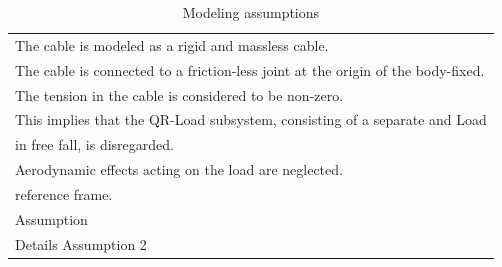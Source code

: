 \begin{table}[h!]
\begin{tabular}{|p{\textwidth}|}
				\tabitem The cable is modeled as a rigid and massless cable. \\
		\tabitem The cable is connected to a friction-less joint at the origin of the body-fixed. \\
		\tabitem The tension in the cable is considered to be non-zero.\\
		\hspace{4mm} This implies that the QR-Load subsystem, consisting of a separate \a{qr} and Load\\
		\hspace{4mm} in free fall, is disregarded.\\		 
		\tabitem Aerodynamic effects acting on the load are neglected.\\
		\hspace{4mm} reference frame.\\
		\tabitem Assumption \\
		\hspace{4mm} Details Assumption 2\\
		\hline
	\end{tabular}
	\caption{Modeling assumptions}
	\label{tab:mod.assumptions}
\end{table}



